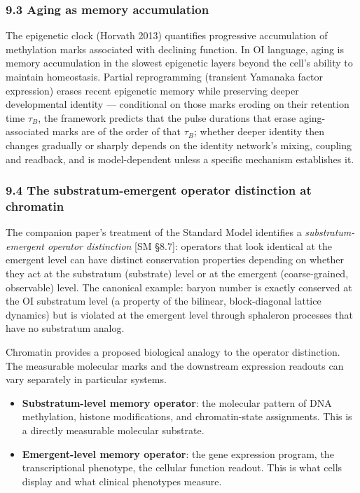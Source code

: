 \documentclass[
]{article}
\providecommand{\tightlist}{%
  \setlength{\itemsep}{0pt}\setlength{\parskip}{0pt}}
\begin{document}
\hypertarget{aging-as-memory-accumulation}{%
\subsubsection{9.3 Aging as memory
accumulation}\label{aging-as-memory-accumulation}}

The epigenetic clock (Horvath 2013) quantifies progressive accumulation
of methylation marks associated with declining function. In OI language,
aging is memory accumulation in the slowest epigenetic layers beyond the
cell's ability to maintain homeostasis. Partial reprogramming (transient
Yamanaka factor expression) erases recent epigenetic memory while
preserving deeper developmental identity --- conditional on those marks
eroding on their retention time \(\tau_B\), the framework predicts that
the pulse durations that erase aging-associated marks are of the order
of that \(\tau_B\); whether deeper identity then changes gradually or
sharply depends on the identity network's mixing, coupling and readback,
and is model-dependent unless a specific mechanism establishes it.

\hypertarget{the-substratum-emergent-operator-distinction-at-chromatin}{%
\subsubsection{9.4 The substratum-emergent operator distinction at
chromatin}\label{the-substratum-emergent-operator-distinction-at-chromatin}}

The companion paper's treatment of the Standard Model identifies a
\emph{substratum-emergent operator distinction} {[}SM §8.7{]}: operators
that look identical at the emergent level can have distinct conservation
properties depending on whether they act at the substratum (substrate)
level or at the emergent (coarse-grained, observable) level. The
canonical example: baryon number is exactly conserved at the OI
substratum level (a property of the bilinear, block-diagonal lattice
dynamics) but is violated at the emergent level through sphaleron
processes that have no substratum analog.

Chromatin provides a proposed biological analogy to the operator
distinction. The measurable molecular marks and the downstream
expression readouts can vary separately in particular systems.

\begin{itemize}
\tightlist
\item
  \textbf{Substratum-level memory operator}: the molecular pattern of
  DNA methylation, histone modifications, and chromatin-state
  assignments. This is a directly measurable molecular substrate.
\item
  \textbf{Emergent-level memory operator}: the gene expression program,
  the transcriptional phenotype, the cellular function readout. This is
  what cells display and what clinical phenotypes measure.
\end{itemize}
\end{document}
